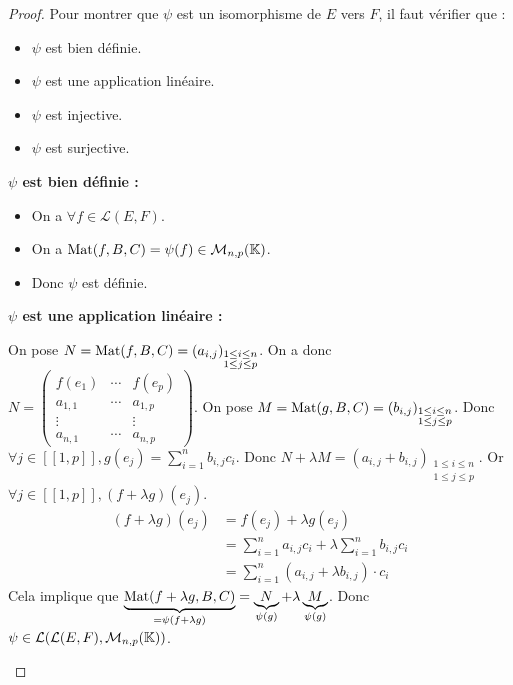 \documentclass[12pt,a4paper]{report}
\begin{document}
\begin{proof}
    Pour montrer que $\psi$ est un isomorphisme de $E$ vers $F$, il faut vérifier que :
    \begin{itemize}
        \item $\psi$ est bien définie.
        \item $\psi$ est une application linéaire.
        \item $\psi$ est injective.
        \item $\psi$ est surjective.
    \end{itemize}

    \textbf{$\psi$ est bien définie :}

    \begin{itemize}
        \item On a $\forall f \in \mathcal L(E,F)$.
        \item On a $\mathrm{Mat}(f,B,C) = \psi(f) \in \mathcal M_{n,p}(\mathbb{K})$.
        \item Donc $\psi$ est définie.
    \end{itemize}

    \textbf{$\psi$ est une application linéaire :}

    \begin{outline}
    \1 On pose $N = \mathrm{Mat}(f,B,C) = (a_{i,j})_{\substack{1 \le i \le n\\ 1 \le j \le p}}$.
    \2 On a donc $N = \left(\begin{matrix} f(e_1) & \cdots & f(e_p)\\
    a_{1,1} & \cdots & a_{1,p} \\
    \vdots & & \vdots \\
    a_{n,1} & \cdots & a_{n,p}
    \end{matrix}\right)$.
    \1 On pose $M = \mathrm{Mat}(g,B,C) = (b_{i,j})_{\substack{1 \le i \le n\\ 1 \le j \le p}}$.
    \2 Donc $\forall j \in [\![1,p]\!], g(e_j) = \sum_{i=1}^{n}b_{i,j}c_i$.
    \1 Donc $N + \lambda M = (a_{i,j} + b_{i,j})_{\substack{1 \le i \le n\\ 1 \le j \le p}}$.
    \1 Or $\forall j \in [\![1,p]\!], (f+\lambda g)(e_j)$.
    \begin{align*}
        (f+ \lambda g)(e_j) &= f(e_j) + \lambda g(e_j)\\
        &= \sum_{i=1}^n a_{i,j} c_i + \lambda \sum_{i=1}^{n}b_{i,j}c_i\\
        &= \sum_{i=1}^{n}(a_{i,j}+\lambda b_{i,j})\cdot c_i
    \end{align*}
    \1 Cela implique que $\underbrace{\mathrm{Mat}(f+\lambda g,B,C)}_{=\psi(f+\lambda g)}= \underbrace{N}_{\psi(g)} + \lambda \underbrace{M}_{\psi(g)}$.
    \1 Donc $\psi \in \mathcal L(\mathcal L(E,F), \mathcal M_{n,p}(\mathbb{K}))$.
    \end{outline}


\end{proof}
\end{document}
